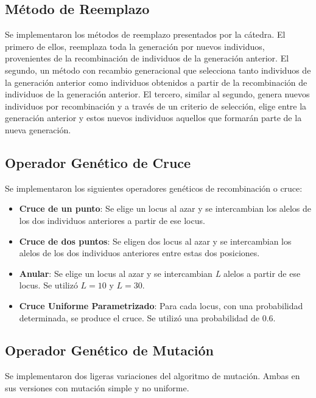 \documentclass[letterpaper,twocolumn,10pt]{article}
\begin{document}
\subsection{Método de Reemplazo}

Se implementaron los métodos de reemplazo presentados por la cátedra. El primero de ellos,
reemplaza toda la generación por nuevos individuos, provenientes de la recombinación
de individuos de la generación anterior. El segundo, un método con recambio
generacional que selecciona tanto individuos de la generación anterior como individuos
obtenidos a partir de la recombinación de individuos de la generación anterior. El tercero,
similar al segundo, genera nuevos individuos por recombinación y a través de un criterio de
selección, elige entre la generación anterior y estos nuevos individuos 
aquellos que formarán parte de la nueva generación.

\subsection{Operador Genético de Cruce}

Se implementaron los siguientes operadores genéticos de recombinación o cruce:

\begin{itemize}
    \item \textbf{Cruce de un punto}: Se elige un locus al azar y se intercambian los
    alelos de los dos individuos anteriores a partir de ese locus.
    \item \textbf{Cruce de dos puntos}: Se eligen dos locus al azar y se intercambian los
    alelos de los dos individuos anteriores entre estas dos posiciones.
    \item \textbf{Anular}: Se elige un locus al azar y se intercambian \textit{L} alelos
    a partir de ese locus. Se utilizó $L=10$ y $L=30$.
    \item \textbf{Cruce Uniforme Parametrizado}: Para cada locus, con una probabilidad
    determinada, se produce el cruce. Se utilizó una probabilidad de $0.6$.
\end{itemize}

\subsection{Operador Genético de Mutación}

Se implementaron dos ligeras variaciones del algoritmo de mutación. Ambas en sus versiones
con mutación simple y no uniforme.
\end{document}
